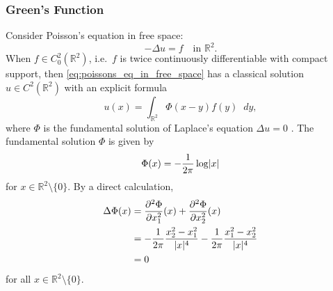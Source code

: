 \documentclass[english, 12pt, a4paper, sci, utf8, a-2b, online]{aaltothesis}
\theoremstyle{definition}
\theoremstyle{plain}
\DeclarePairedDelimiter\abs{\lvert}{\rvert}
\newcommand*\diff{\mathop{}\!d}
\numberwithin{equation}{section}
\begin{document}
\subsubsection{Green's Function}
\label{subsubsec:greens_function}

Consider Poisson's equation in free space:
\begin{equation}
    \label{eq:poissons_eq_in_free_space}
    -\Delta u = f \quad \text{in } \mathbb{R}^2.
\end{equation}
When $f \in C_0^2(\mathbb{R}^2)$, i.e.\ $f$ is twice continuously differentiable
with compact support, then \eqref{eq:poissons_eq_in_free_space} has
a classical solution $u \in C^2(\mathbb{R}^2)$ with an explicit formula
\begin{equation*}
    u(x) = \int_{\mathbb{R}^2} \Phi(x-y) f(y) \diff y,
\end{equation*}
where $\Phi$ is the fundamental solution of Laplace's equation $\Delta u = 0$
\cite[Theorem 1 on p. 23]{evans2010}. The fundamental solution $\Phi$ is given by
\begin{equation*}
    \Phi(x) = -\frac{1}{2 \pi} \log \abs{x}
\end{equation*}
for $x \in \mathbb{R}^2 \setminus \{ 0 \}$.
By a direct calculation,
\begin{align*}
    \Delta \Phi(x)
    &= \frac{\partial^2 \Phi}{\partial x_1^2}(x)
        + \frac{\partial^2 \Phi}{\partial x_2^2}(x) \\
    &= -\frac{1}{2\pi} \frac{x_2^2 - x_1^2}{\abs{x}^4}
        -\frac{1}{2\pi} \frac{x_1^2 - x_2^2}{\abs{x}^4} \\
    &= 0
\end{align*}
for all $x \in \mathbb{R}^2 \setminus \{ 0 \}$.
\end{document}
